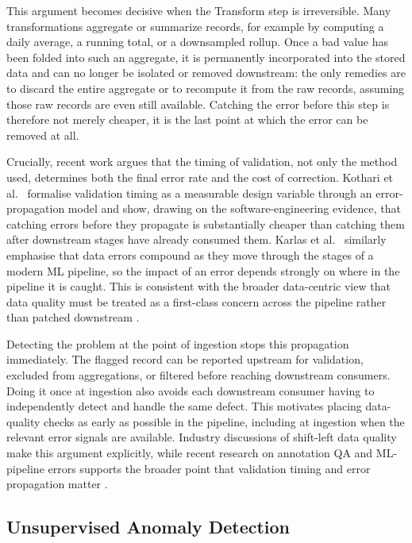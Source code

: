 \documentclass[12pt]{article}
\begin{document}
This argument becomes decisive when the Transform step is irreversible. Many transformations aggregate or summarize records, for example by computing a daily average, a running total, or a downsampled rollup. Once a bad value has been folded into such an aggregate, it is permanently incorporated into the stored data and can no longer be isolated or removed downstream: the only remedies are to discard the entire aggregate or to recompute it from the raw records, assuming those raw records are even still available. Catching the error before this step is therefore not merely cheaper, it is the last point at which the error can be removed at all.

Crucially, recent work argues that the timing of validation, not only the method used, determines both the final error rate and the cost of correction. Kothari et al.\ \cite{kothari2026earlyqa} formalise validation timing as a measurable design variable through an error-propagation model and show, drawing on the software-engineering evidence, that catching errors before they propagate is substantially cheaper than catching them after downstream stages have already consumed them. Karlas et al.\ \cite{karlas2025navigating} similarly emphasise that data errors compound as they move through the stages of a modern ML pipeline, so the impact of an error depends strongly on where in the pipeline it is caught. This is consistent with the broader data-centric view that data quality must be treated as a first-class concern across the pipeline rather than patched downstream \cite{whang2023datacentric}.

Detecting the problem at the point of ingestion stops this propagation immediately. The flagged record can be reported upstream for validation, excluded from aggregations, or filtered before reaching downstream consumers. Doing it once at ingestion also avoids each downstream consumer having to independently detect and handle the same defect. This motivates placing data-quality checks as early as possible in the pipeline, including at ingestion when the relevant error signals are available. Industry discussions of shift-left data quality make this argument explicitly, while recent research on annotation QA and ML-pipeline errors supports the broader point that validation timing and error propagation matter \cite{datakitchen2023shiftleft, kothari2026earlyqa, karlas2025navigating}.

\subsection{Unsupervised Anomaly Detection}
\end{document}
